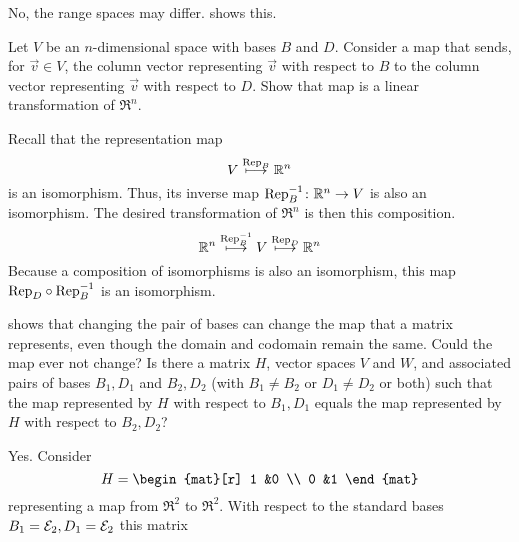 \begin{exercises}
\begin{answer}
      No, the range spaces may differ.
       shows this.
    \end{answer}
  \recommended \item 
    Let \( V \) be an \( n \)-dimensional space with bases \( B \) and
    \( D \).
    Consider a map that sends, for \( \vec{v}\in V\), 
    the column vector representing \( \vec{v} \) with
    respect to \( B \) to the column vector representing \( \vec{v} \) with
    respect to \( D \).
    Show that map is a linear transformation of \( \Re^n \).
    \begin{answer}
      Recall that the representation map
      \begin{equation*}
        V\stackrel{\text{Rep}_{B}}{\longmapsto}\mathbb{R}^n
      \end{equation*}
      is an isomorphism.
      Thus, its inverse map $\mbox{$\mbox{Rep}_B^{-1}\colon \mathbb{R}^n\to V$}$
      is also an isomorphism.
      The desired transformation of $\Re^n$ is then this composition.
      \begin{equation*}
        \mathbb{R}^n\stackrel{\text{Rep}_{B}^{-1}}{\longmapsto}
        V\stackrel{\text{Rep}_{D}}{\longmapsto}\mathbb{R}^n
      \end{equation*}
      Because a composition of isomorphisms is also an isomorphism, 
      this map $\mbox{Rep}_{D}\mathbin{\circ} \mbox{Rep}_{B}^{-1}$
      is an isomorphism.
    \end{answer}
  \item 
     shows that changing the pair of
    bases can change the map that a matrix
    represents, even though the domain and codomain remain the same.
    Could the map ever not change?
    Is there a matrix \( H \), vector spaces \( V \) and \( W \), and
    associated pairs of bases \( B_1,D_1 \) and \( B_2,D_2 \) (with
    \( B_1\neq B_2 \) or \( D_1\neq D_2 \) or both) 
    such that the map represented
    by \( H \) with respect to \( B_1,D_1 \) equals the map represented
    by \( H \) with respect to \( B_2,D_2 \)?
    \begin{answer}
      Yes.
      Consider
      \begin{equation*}
        H=\begin{mat}[r]
            1  &0  \\
            0  &1
          \end{mat}
      \end{equation*}
      representing a map from \( \Re^2 \) to \( \Re^2 \).
      With respect to the standard bases 
      \( B_1={\cal E}_2, D_1={\cal E}_2 \) this matrix

\end{answer}
\end{exercises}
